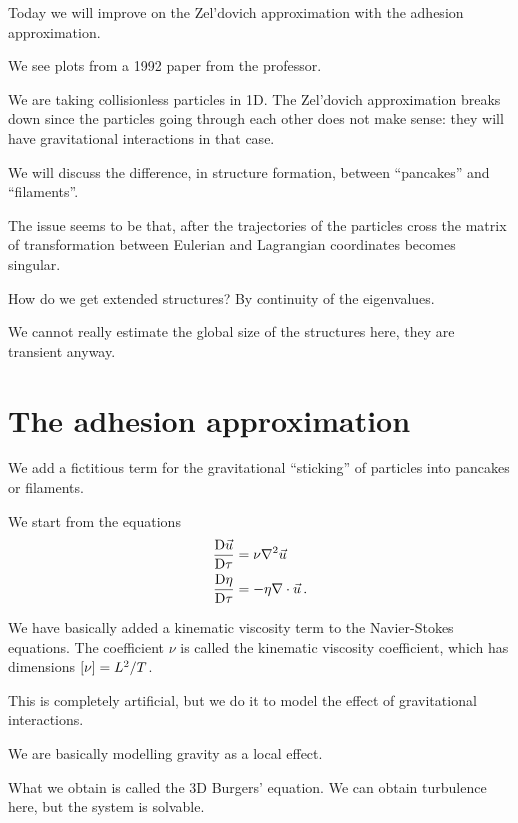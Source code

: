 \documentclass[main.tex]{subfiles}
\begin{document}

Today we will improve on the Zel'dovich approximation with the adhesion approximation.

We see plots from a 1992 paper from the professor. 

We are taking collisionless particles in 1D. The Zel'dovich approximation breaks down since the particles going through each other does not make sense: they will have gravitational interactions in that case.

We will discuss the difference, in structure formation, between ``pancakes'' and ``filaments''.

The issue seems to be that, after the trajectories of the particles cross the matrix of transformation between Eulerian and Lagrangian coordinates becomes singular.

How do we get extended structures? By continuity of the eigenvalues. 

We cannot really estimate the global size of the structures here, they are transient anyway.

\section{The adhesion approximation}

We add a fictitious term for the gravitational ``sticking'' of particles into pancakes or filaments. 

We start from the equations
%
\begin{subequations}
\begin{align}
\frac{\mathrm{D} \vec{u}}{\mathrm{D} \tau } &= \nu \nabla^2 \vec{u}  \\
\frac{\mathrm{D} \eta }{\mathrm{D} \tau } &= - \eta \nabla \cdot \vec{u}
\,.
\end{align}
\end{subequations}

We have basically added a kinematic viscosity term to the Navier-Stokes equations.
The coefficient \(\nu \) is called the kinematic viscosity coefficient, which has dimensions \(\qty[\nu ] = L^2 /T\).

This is completely artificial, but we do it to model the effect of gravitational interactions. 

We are basically modelling gravity as a local effect. 

What we obtain is called the 3D Burgers' equation. 
We can obtain turbulence here, but the system is solvable.
\end{document}
